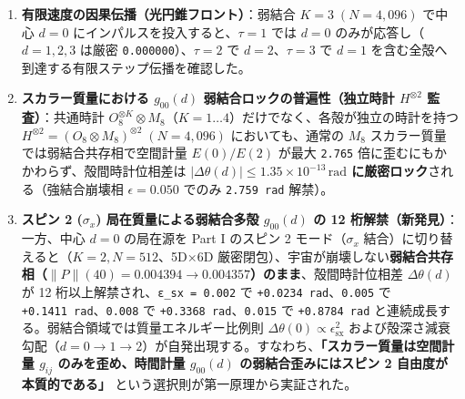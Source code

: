 \documentclass[
  a4paper,
]{ltjsarticle}
\providecommand{\tightlist}{%
  \setlength{\itemsep}{0pt}\setlength{\parskip}{0pt}}
\begin{document}
\begin{enumerate}
  \begin{itemize}
  \tightlist
  \item
    \textbf{弱結合共存相（\(\epsilon = 0.6\,\epsilon_c(K)\)）}：\(K=4\)
    において内殻 \(d=0 \to 1 \to 2\) で \(\Delta\phi(d)\) が殻あたり約
    \texttt{0.20}（\(1/5\)）倍で減衰し、Part III の対数変換 \(r = 5^d\)
    のもとで \textbf{\(\Delta\phi(r) \propto 1/r\) 型}
    に対応する（最外殻手前 \(d=K-1\)
    では総ノルム保存に伴う符号反転波紋が生じる）。
  \item
    \textbf{強結合・地平面形成相（\(\epsilon = 0.16 > \epsilon_c(K)\)）}：特異点
    \(d=0\)（\(\Delta\phi \approx +44 \sim +52\)）の外側
    \(d = 1 \dots K\) にわたって、\(K=2\):
    \texttt{+4.09,\ 0.00}、\(K=3\):
    \texttt{+7.85,\ +4.03,\ 0.00}、\(K=4\):
    \texttt{+11.43,\ +7.81,\ +4.18,\ 0.00} という極めて規則的な
    \textbf{等間隔線形勾配 \(\Delta\phi(d) \approx 3.8\,(K - d)\)}
    が現れる。
  \end{itemize}
\item
  \textbf{有限速度の因果伝播（光円錐フロント）}：弱結合
  \(K=3\;(N=4{,}096)\) で中心 \(d=0\)
  にインパルスを投入すると、\(\tau=1\) では \(d=0\)
  のみが応答し（\(d=1,2,3\) は厳密 \texttt{0.000000}）、\(\tau=2\) で
  \(d=2\)、\(\tau=3\) で \(d=1\)
  を含む全殻へ到達する有限ステップ伝播を確認した。
\item
  \textbf{スカラー質量における \(g_{00}(d)\)
  弱結合ロックの普遍性（独立時計 \(H^{\otimes 2}\) 監査）}：共通時計
  \(O_8^{\otimes K}\otimes M_8\)（\(K=1\dots 4\)）だけでなく、各殻が独立の時計を持つ
  \textbf{\(H^{\otimes 2} = (O_8\otimes M_8)^{\otimes 2}\;(N=4{,}096)\)}
  においても、通常の \(M_8\) スカラー質量では弱結合共存相で空間計量
  \(E(0)/E(2)\) が最大 \texttt{2.765}
  倍に歪むにもかかわらず、殻間時計位相差は
  \textbf{\(|\Delta\theta(d)| \le 1.35 \times 10^{-13}\,\mathrm{rad}\)
  に厳密ロック}される（強結合崩壊相 \(\epsilon=0.050\) でのみ
  \texttt{2.759\ rad} 解禁）。
\item
  \textbf{スピン 2 (\(\sigma_x\)) 局在質量による弱結合多殻 \(g_{00}(d)\)
  の 12 桁解禁（新発見）}：一方、中心 \(d=0\) の局在源を Part I のスピン
  2 モード（\(\sigma_x\) 結合）に切り替えると（\(K=2, N=512\)、5D×6D
  厳密閉包）、宇宙が崩壊しない\textbf{弱結合共存相（\(\|P\|(40) = 0.004394 \to 0.004357\)）のまま}、殻間時計位相差
  \(\Delta\theta(d)\) が 12 桁以上解禁され、\texttt{ε\_sx\ =\ 0.002} で
  \texttt{+0.0234\ rad}、\texttt{0.005} で
  \texttt{+0.1411\ rad}、\texttt{0.008} で
  \texttt{+0.3368\ rad}、\texttt{0.015} で \texttt{+0.8784\ rad}
  と連続成長する。弱結合領域では質量エネルギー比例則
  \textbf{\(\Delta\theta(0) \propto \epsilon_{\mathrm{sx}}^2\)}
  および殻深さ減衰勾配（\(d=0 \to 1 \to 2\)）が自発出現する。すなわち、\textbf{「スカラー質量は空間計量
  \(g_{ij}\) のみを歪め、時間計量 \(g_{00}(d)\) の弱結合歪みにはスピン 2
  自由度が本質的である」} という選択則が第一原理から実証された。
\end{enumerate}
\end{document}
